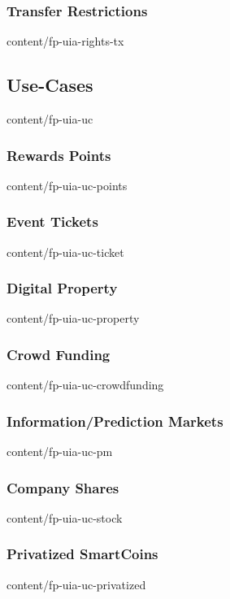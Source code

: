 \documentclass{btswhitepaper}
\begin{document}
\subsubsection  { Transfer Restrictions                            }  { content/fp-uia-rights-tx       } 
\subsection     { Use-Cases                                        }  { content/fp-uia-uc              } 
\subsubsection  { Rewards Points                                   }  { content/fp-uia-uc-points       } 
\subsubsection  { Event Tickets                                    }  { content/fp-uia-uc-ticket       } 
\subsubsection  { Digital Property                                 }  { content/fp-uia-uc-property     } 
\subsubsection  { Crowd Funding                                    }  { content/fp-uia-uc-crowdfunding } 
\subsubsection  { Information/Prediction Markets                   }  { content/fp-uia-uc-pm           } 
\subsubsection  { Company Shares                                   }  { content/fp-uia-uc-stock        } 
\subsubsection  { Privatized SmartCoins                            }  { content/fp-uia-uc-privatized   } 
\end{document}
